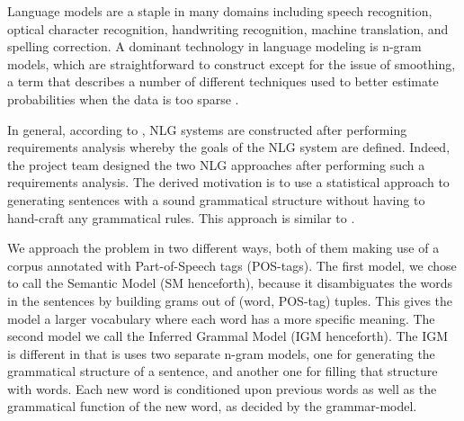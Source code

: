 \documentclass[ai15_group61_report.tex]{subfiles}
\begin{document}
Language models are a staple in many domains including speech recognition, optical character recognition, handwriting recognition, machine translation, and spelling correction. A dominant technology in language modeling is n-gram models, which are straightforward to construct except for the issue of smoothing, a term that describes a number of different techniques used to better estimate probabilities when the data is too sparse \cite{chen-smoothing}.

In general, according to \cite{Reiter:2000:BNL:331955}, NLG systems are constructed after performing requirements analysis whereby the goals of the NLG system are defined. Indeed, the project team designed the two NLG approaches after performing such a requirements analysis. The derived motivation is to use a statistical approach to generating sentences with a sound grammatical structure without having to hand-craft any grammatical rules. This approach is similar to \cite{Ratnaparkhi00}.

We approach the problem in two different ways, both of them making use of a corpus annotated with Part-of-Speech tags (POS-tags). The first model, we chose to call the Semantic Model (SM henceforth), because it disambiguates the words in the sentences by building grams out of (word, POS-tag) tuples. This gives the model a larger vocabulary where each word has a more specific meaning. The second model we call the Inferred Grammal Model (IGM henceforth). The IGM is different in that is uses two separate n-gram models, one for generating the grammatical structure of a sentence, and another one for filling that structure with words. Each new word is conditioned upon previous words as well as the grammatical function of the new word, as decided by the grammar-model.
\end{document}
